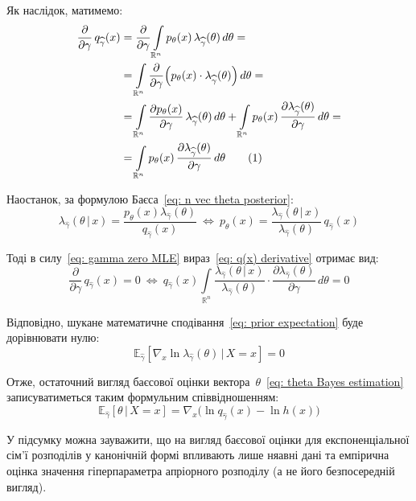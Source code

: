 Як наслідок, матимемо:
\begin{align*}\label{eq: q(x) derivative}
    \frac{\partial}{\partial \gamma}\, q_{\widehat{\gamma}}(x) & = \frac{\partial}{\partial \gamma} \int\limits_{\mathbb{R}^n} p_{\theta}(x) \, \lambda_{\widehat{\gamma}}(\theta) \, d\theta = \\
    & = \int\limits_{\mathbb{R}^n} \frac{\partial}{\partial \gamma} \Bigl( p_{\theta}(x) \cdot \lambda_{\widehat{\gamma}}(\theta) \Bigr) \, d\theta = \\
    & = \int\limits_{\mathbb{R}^n} \frac{\partial p_{\theta}(x)}{\partial \gamma}\,\lambda_{\widehat{\gamma}}(\theta) \, d\theta + \int\limits_{\mathbb{R}^n} p_{\theta}(x)\,\frac{\partial \lambda_{\widehat{\gamma}}(\theta)}{\partial \gamma} \, d\theta = \\
    & = \int\limits_{\mathbb{R}^n} p_{\theta}(x)\,\frac{\partial \lambda_{\widehat{\gamma}}(\theta)}{\partial \gamma} \, d\theta \stepcounter{equation}\tag{\theequation}
\end{align*}

Наостанок, за формулою Баєса~\eqref{eq: n vec theta posterior}:
\begin{equation}\label{eq: Bayes rule}
    \lambda_{\widehat{\gamma}}(\theta \,|\, x) = \frac{p_{\theta}(x)\lambda_{\widehat{\gamma}}(\theta)}{q_{\widehat{\gamma}}(x)} \ \Longleftrightarrow \ p_{\theta}(x) = \frac{\lambda_{\widehat{\gamma}}(\theta \,|\, x)}{\lambda_{\widehat{\gamma}}(\theta)}\,q_{\widehat{\gamma}}(x)
\end{equation}

Тоді в силу~\eqref{eq: gamma zero MLE} вираз~\eqref{eq: q(x) derivative} отримає вид:
\begin{equation}
    \frac{\partial}{\partial \gamma}\, q_{\widehat{\gamma}}(x) = 0 
    \ \Longleftrightarrow \ 
    q_{\widehat{\gamma}}(x) \int\limits_{\mathbb{R}^n} \frac{\lambda_{\widehat{\gamma}}(\theta \,|\, x)}{\lambda_{\widehat{\gamma}}(\theta)} \cdot \frac{\partial \lambda_{\widehat{\gamma}}(\theta)}{\partial \gamma} \, d\theta = 0
\end{equation}

Відповідно, шукане математичне сподівання~\eqref{eq: prior expectation} буде дорівнювати нулю:
\begin{equation}
    \mathbb{E}_{\widehat{\gamma}} \left[ \nabla_x\ln{\lambda_{\widehat{\gamma}}(\theta)} \,|\, X=x \right] = 0
\end{equation}

Отже, остаточний вигляд баєсової оцінки вектора~$\theta$~\eqref{eq: theta Bayes estimation} записуватиметься таким формульним співвідношенням: 
\begin{equation}
    \mathbb{E}_{\widehat{\gamma}} \left[ \theta \,|\, X=x \right] = \nabla_x\bigl( \ln{q_{\widehat{\gamma}}(x)} - \ln{h(x)} \bigr)
\end{equation}

\begin{remark}
    У підсумку можна зауважити, що на вигляд баєсової оцінки для експоненціальної сім'ї розподілів у канонічній формі впливають лише няавні дані та емпірична оцінка значення гіперпараметра апріорного розподілу (а не його безпосередній вигляд).
\end{remark}